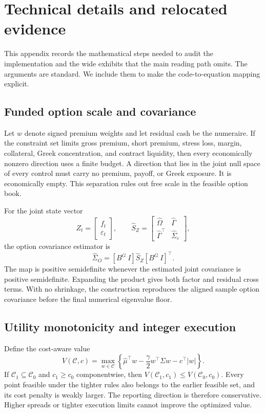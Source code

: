 \section{Technical details and relocated evidence}

This appendix records the mathematical steps needed to audit the implementation and the
wide exhibits that the main reading path omits. The arguments are standard. We include
them to make the code-to-equation mapping explicit.

\subsection{Funded option scale and covariance}

Let \(w\) denote signed premium weights and let residual cash be the numeraire. If the
constraint set limits gross premium, short premium, stress loss, margin, collateral,
Greek concentration, and contract liquidity, then every economically nonzero direction
uses a finite budget. A direction that lies in the joint null space of every control must
carry no premium, payoff, or Greek exposure. It is economically empty. This separation
rules out free scale in the feasible option book.

For the joint state vector
\[
 Z_t=\begin{bmatrix}f_t\\ \varepsilon_t\end{bmatrix},
 \qquad
 \widehat S_Z=
 \begin{bmatrix}
 \widehat\Omega&\widehat\Gamma\\
 \widehat\Gamma^\top&\widehat\Sigma_\varepsilon
 \end{bmatrix},
\]
the option covariance estimator is
\[
 \widehat\Sigma_O=[B^G\ I]\widehat S_Z[B^G\ I]^\top.
\]
The map is positive semidefinite whenever the estimated joint covariance is positive
semidefinite. Expanding the product gives both factor and residual cross terms. With no
shrinkage, the construction reproduces the aligned sample option covariance before the
final numerical eigenvalue floor.

\subsection{Utility monotonicity and integer execution}

Define the cost-aware value
\[
 V(\mathcal C,c)=
 \max_{w\in\mathcal C}
 \left\{
 \widehat\mu^\top w
 -\frac{\gamma}{2}w^\top\Sigma w
 -c^\top|w|
 \right\}.
\]
If \(\mathcal C_1\subseteq\mathcal C_0\) and \(c_1\ge c_0\) componentwise, then
\(V(\mathcal C_1,c_1)\le V(\mathcal C_0,c_0)\). Every point feasible under the tighter
rules also belongs to the earlier feasible set, and its cost penalty is weakly larger.
The reporting direction is therefore conservative. Higher spreads or tighter execution
limits cannot improve the optimized value.

